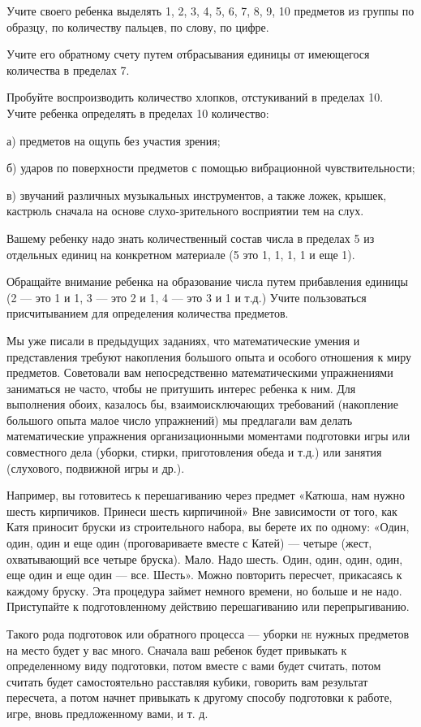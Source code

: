 \documentclass[a5paper]{book}
\begin{document}
Учите своего ребенка выделять 1, 2, 3, 4, 5, 6, 7, 8, 9, 10 предметов из
группы по образцу, по количеству пальцев, по слову, по цифре.

Учите его обратному счету путем отбрасывания единицы от имеющегося
количества в пределах 7.

Пробуйте воспроизводить количество хлопков, отстукиваний в пределах 10.
Учите ребенка определять в пределах 10 количество:

а) предметов на ощупь без участия зрения;

б) ударов по поверхности предметов с помощью вибрационной
чувствительности;

в) звучаний различных музыкальных инструментов, а также ложек, крышек,
кастрюль сначала на основе слухо-зрительного восприятии тем на слух.

Вашему ребенку надо знать количественный состав числа в пределах 5 из
отдельных единиц на конкретном материале (5 это 1, 1, 1, 1 и еще 1).

Обращайте внимание ребенка на образование числа путем прибавления
единицы (2 --- это 1 и 1, 3 --- это 2 и 1, 4 --- это 3 и 1 и т.д.) Учите
пользоваться присчитыванием для определения количества предметов.

Мы уже писали в предыдущих заданиях, что математические умения и
представления требуют накопления большого опыта и особого отношения к
миру предметов. Советовали вам непосредственно математическими
упражнениями заниматься не часто, чтобы не притушить интерес ребенка к
ним. Для выполнения обоих, казалось бы, взаимоисключающих требований
(накопление большого опыта малое число упражнений) мы предлагали вам
делать математические упражнения организационными моментами подготовки
игры или совместного дела (уборки, стирки, приготовления обеда и т.д.)
или занятия (слухового, подвижной игры и др.).

Например, вы готовитесь к перешагиванию через предмет «Катюша, нам нужно
шесть кирпичиков. Принеси шесть кирпичиной» Вне зависимости от того, как
Катя приносит бруски из строительного набора, вы берете их по одному:
«Один, один, один и еще один (проговариваете вместе с Катей) --- четыре
(жест, охватывающий все четыре бруска). Мало. Надо шесть. Один, один,
один, один, еще один и еще один --- все. Шесть». Можно повторить
пересчет, прикасаясь к каждому бруску. Эта процедура займет немного
времени, но больше и не надо. Приступайте к подготовленному действию
перешагиванию или перепрыгиванию.

Такого рода подготовок или обратного процесса --- уборки \textsc{не}
нужных предметов на место будет у вас много. Сначала ваш ребенок будет
привыкать к определенному виду подготовки, потом вместе с вами будет
считать, потом считать будет самостоятельно расставляя кубики, говорить
вам результат пересчета, а потом начнет привыкать к другому способу
подготовки к работе, игре, вновь предложенному вами, и т. д.
\end{document}
